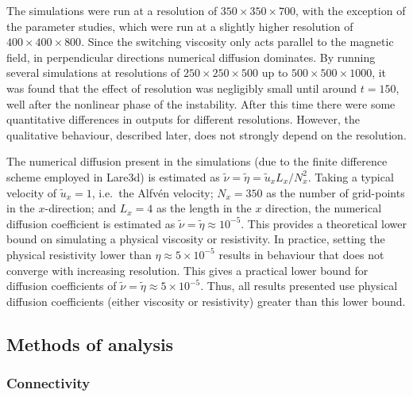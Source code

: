 The simulations were run at a resolution of $350 \times 350 \times 700$, with the exception of the parameter studies, which were run at a slightly higher resolution of $400 \times 400 \times 800$. Since the switching viscosity only acts parallel to the magnetic field, in perpendicular directions numerical diffusion dominates. By running several simulations at resolutions of $250 \times 250 \times 500$ up to $500 \times 500 \times 1000$, it was found that the effect of resolution was negligibly small until around $t=150$, well after the nonlinear phase of the instability. After this time there were some quantitative differences in outputs for different resolutions. However, the qualitative behaviour, described later, does not strongly depend on the resolution.

The numerical diffusion present in the simulations (due to the finite difference scheme employed in Lare3d) is estimated as $\tilde{\nu} = \tilde{\eta} = \tilde{u}_x L_x/N_x^2$. Taking a typical velocity of $\tilde{u}_x = 1$, i.e.\ the Alfv\'en velocity; $N_x = 350$ as the number of grid-points in the $x$-direction; and $L_x = 4$ as the length in the $x$ direction, the numerical diffusion coefficient is estimated as $\tilde{\nu} = \tilde{\eta} \approx 10^{-5}$. This provides a theoretical lower bound on simulating a physical viscosity or resistivity. In practice, setting the physical resistivity lower than $\eta \approx 5\times10^{-5}$ results in behaviour that does not converge with increasing resolution. This gives a practical lower bound for diffusion coefficients of $\tilde{\nu} = \tilde{\eta} \approx 5 \times 10^{-5}$. Thus, all results presented use physical diffusion coefficients (either viscosity or resistivity) greater than this lower bound.

\subsection{Methods of analysis}

\label{sec:kink_methods_analysis}

\subsubsection{Connectivity}

